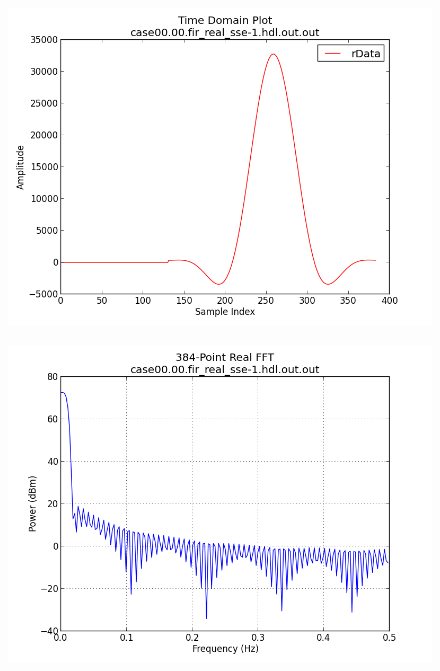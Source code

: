 \documentclass{article}
\begin{document}
	\begin{figure}[ht]
		\centering
		\begin{minipage}{.5\textwidth}
			\centering\includegraphics[width=1.0\linewidth]{output_time}
			\label{fig:out_time}
		\end{minipage}%
		\begin{minipage}{.5\textwidth}
			\centering\includegraphics[width=1.0\linewidth]{output_freq}
			\label{fig:out_freq}
		\end{minipage}
	\end{figure}
\end{document}
